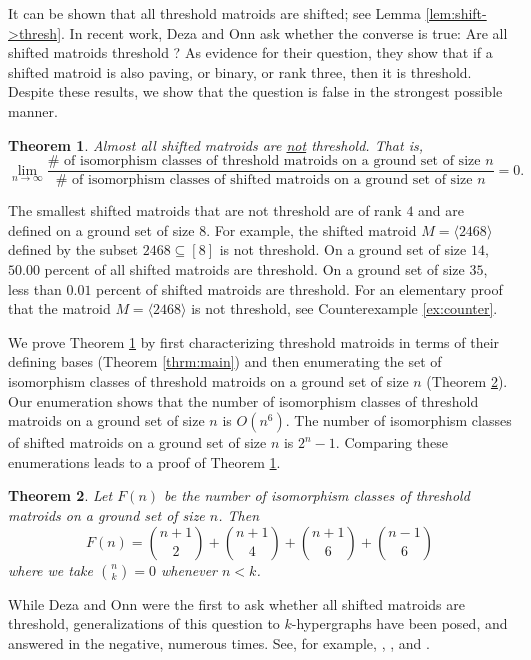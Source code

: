 \documentclass{amsart}
\theoremstyle{definition}
\theoremstyle{plain}
\newtheorem{mainthrm}{Theorem}
\begin{document}
It can be shown that all threshold matroids are shifted; see Lemma \ref{lem:shift->thresh}. In recent work, Deza and Onn ask whether the converse is true: Are all shifted matroids threshold \cite[Question $7.2$]{DO}? As evidence for their question, they show that if a shifted matroid is also paving, or binary, or rank three, then it is threshold. Despite these results, we show that the question is false in the strongest possible manner.

\begin{mainthrm}
  \label{thrm:almost}
  Almost all shifted matroids are \underline{not} threshold. That is,
    \[\lim_{n\to\infty}\frac{\text{$\#$ of isomorphism classes of threshold matroids on a ground set of size $n$}}{\text{$\#$ of isomorphism classes of shifted matroids on a ground set of size $n$}}=0. \]
\end{mainthrm}

The smallest shifted matroids that are not threshold are of rank $4$ and are defined on a ground set of size $8$. For example, the shifted matroid $M= \langle 2468 \rangle$ defined by the subset $2468 \subseteq [8]$ is not threshold. On a ground set of size $14$, $50.00$ percent of all shifted matroids are threshold. On a ground set of size $35$, less than $0.01$ percent of shifted matroids are threshold. For an elementary proof that the matroid $M=\langle 2468\rangle$ is not threshold, see Counterexample \ref{ex:counter}.

We prove Theorem \ref{thrm:almost} by first characterizing threshold matroids in terms of their defining bases (Theorem \ref{thrm:main}) and then enumerating the set of isomorphism classes of threshold matroids on a ground set of size $n$ (Theorem \ref{thrm:enumeration}). Our enumeration shows that the number of isomorphism classes of threshold matroids on a ground set of size $n$ is $O(n^6)$. The number of isomorphism classes of shifted matroids on a ground set of size $n$ is $2^n-1$. Comparing these enumerations leads to a proof of Theorem \ref{thrm:almost}.

\begin{mainthrm}
  \label{thrm:enumeration}
Let $F(n)$ be the number of isomorphism classes of threshold matroids on a ground set of size $n$. Then
\[F(n) = \binom{n+1}{2} + \binom{n+1}{4}+ \binom{n+1}{6} + \binom{n-1}{6}\]
where we take $\binom{n}{k}=0$ whenever $n<k$.
\end{mainthrm}

While Deza and Onn were the first to ask whether all shifted matroids are threshold, generalizations of this question to $k$-hypergraphs have been posed, and answered in the negative, numerous times. See, for example,  \cite[Theorem $3.1$]{KR}, \cite[Example $2.2$]{RRST}, \cite[Theorem $7.3.3$]{Muroga} and \cite[Example $2.15$]{BS}. 
\end{document}
